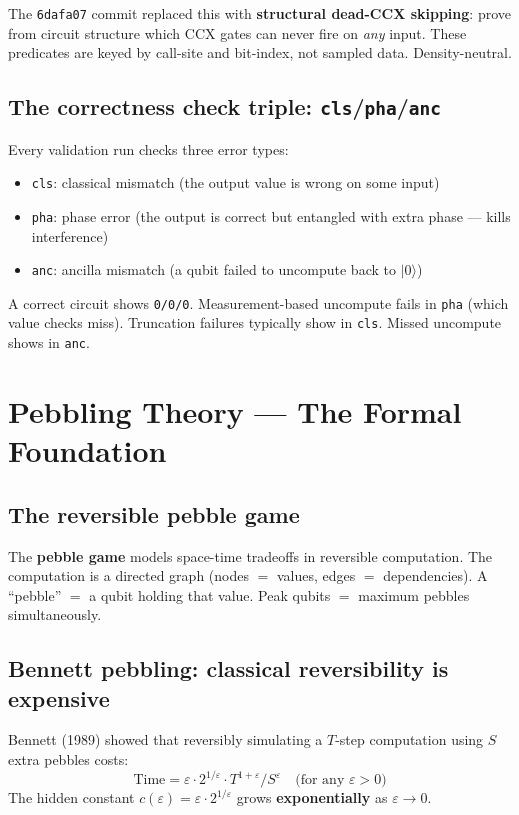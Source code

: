 \documentclass[11pt,a4paper]{article}
\newcommand{\ket}[1]{$|#1\rangle$\xspace}
\newcommand{\cls}{\texttt{cls}\xspace}
\newcommand{\pha}{\texttt{pha}\xspace}
\newcommand{\anc}{\texttt{anc}\xspace}
\begin{document}
The \texttt{6dafa07} commit replaced this with \textbf{structural dead-CCX skipping}: prove from
circuit structure which CCX gates can never fire on \emph{any} input. These predicates are keyed
by call-site and bit-index, not sampled data. Density-neutral.

\subsection{The correctness check triple: \cls/\pha/\anc}

Every validation run checks three error types:
\begin{itemize}
  \item \cls: classical mismatch (the output value is wrong on some input)
  \item \pha: phase error (the output is correct but entangled with extra phase --- kills interference)
  \item \anc: ancilla mismatch (a qubit failed to uncompute back to \ket{0})
\end{itemize}

A correct circuit shows \texttt{0/0/0}. Measurement-based uncompute fails in \pha{} (which value
checks miss). Truncation failures typically show in \cls. Missed uncompute shows in \anc.

\section{Pebbling Theory --- The Formal Foundation}
\label{sec:pebbling}

\subsection{The reversible pebble game}

The \textbf{pebble game} models space-time tradeoffs in reversible computation. The computation is
a directed graph (nodes $=$ values, edges $=$ dependencies). A ``pebble'' $=$ a qubit holding that
value. Peak qubits $=$ maximum pebbles simultaneously.

\subsection{Bennett pebbling: classical reversibility is expensive}

Bennett (1989) showed that reversibly simulating a $T$-step computation using $S$ extra pebbles
costs:
\[
  \text{Time} = \varepsilon \cdot 2^{1/\varepsilon} \cdot T^{1+\varepsilon} / S^\varepsilon \quad \text{(for any $\varepsilon > 0$)}
\]
The hidden constant $c(\varepsilon) = \varepsilon \cdot 2^{1/\varepsilon}$ grows \textbf{exponentially}
as $\varepsilon \to 0$.
\end{document}
